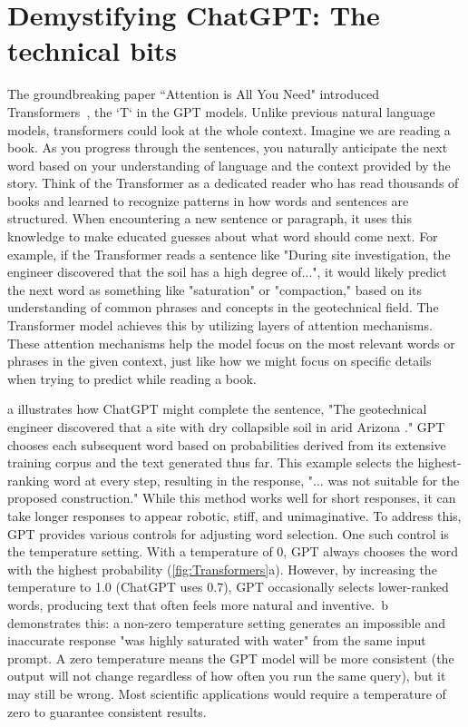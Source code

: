 \documentclass[12pt]{article}
\begin{document}
\section{Demystifying ChatGPT: The technical bits}
The groundbreaking paper ``Attention is All You Need" introduced Transformers~\parencite{vaswani2017attention}, the `T` in the GPT models. Unlike previous natural language models, transformers could look at the whole context. Imagine we are reading a book. As you progress through the sentences, you naturally anticipate the next word based on your understanding of language and the context provided by the story. Think of the Transformer as a dedicated reader who has read thousands of books and learned to recognize patterns in how words and sentences are structured. When encountering a new sentence or paragraph, it uses this knowledge to make educated guesses about what word should come next. For example, if the Transformer reads a sentence like "During site investigation, the engineer discovered that the soil has a high degree of...", it would likely predict the next word as something like "saturation" or "compaction," based on its understanding of common phrases and concepts in the geotechnical field. The Transformer model achieves this by utilizing layers of attention mechanisms. These attention mechanisms help the model focus on the most relevant words or phrases in the given context, just like how we might focus on specific details when trying to predict while reading a book.

a illustrates how ChatGPT might complete the sentence, "The geotechnical engineer discovered that a site with dry collapsible soil in arid Arizona \underline{\hspace{1cm}}." GPT chooses each subsequent word based on probabilities derived from its extensive training corpus and the text generated thus far. This example selects the highest-ranking word at every step, resulting in the response, "... was not suitable for the proposed construction." While this method works well for short responses, it can take longer responses to appear robotic, stiff, and unimaginative. To address this, GPT provides various controls for adjusting word selection. One such control is the temperature setting. With a temperature of 0, GPT always chooses the word with the highest probability (\cref{fig:Transformers}a). However, by increasing the temperature to 1.0 (ChatGPT uses 0.7), GPT occasionally selects lower-ranked words, producing text that often feels more natural and inventive.~b demonstrates this: a non-zero temperature setting generates an impossible and inaccurate response "was highly saturated with water" from the same input prompt. A zero temperature means the GPT model will be more consistent (the output will not change regardless of how often you run the same query), but it may still be wrong. Most scientific applications would require a temperature of zero to guarantee consistent results. 
\end{document}
